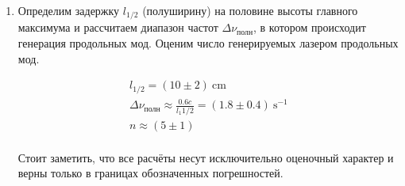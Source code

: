 \begin{enumerate}
    \item
    Определим задержку $l_{1/2}$ (полуширину) на половине высоты главного максимума и рассчитаем диапазон частот $\Delta \nu_{\text{полн}}$, в котором происходит генерация продольных мод. Оценим число генерируемых лазером продольных мод.
    
    \begin{gather*}
        l_{1/2} = (10 \pm 2)~\text{cm}\\
        \Delta \nu_{\text{полн}} \approx \frac{0.6 c}{l_1
        {1/2}} = (1.8 \pm 0.4)~\text{s}^{-1}\\
        n \approx (5 \pm 1)\\
    \end{gather*}

    Стоит заметить, что все расчёты несут исключительно оценочный характер и верны только в границах обозначенных погрешностей. 
    
    
\end{enumerate}



